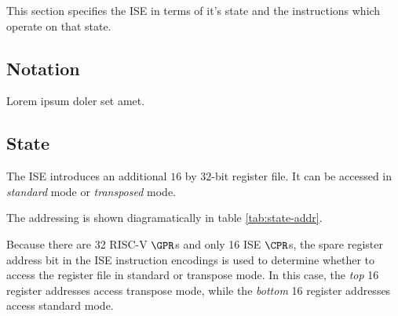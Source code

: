 
This section specifies the ISE in terms of it's state and the instructions
which operate on that state.

\subsection{Notation}

Lorem ipsum doler set amet.


\subsection{State}

The ISE introduces an additional $16$ by $32$-bit register file. It can
be accessed in {\em standard} mode or {\em transposed} mode.

The addressing is shown diagramatically in table \ref{tab:state-addr}.

Because there are 32 RISC-V $\GPR$s and only 16 ISE $\CPR$s, the spare
register address bit in the ISE instruction encodings is used to determine
whether to access the register file in standard or transpose mode. In this
case, the {\em top} 16 register addresses access transpose mode, while the
{\em bottom} 16 register addresses access standard mode. 

